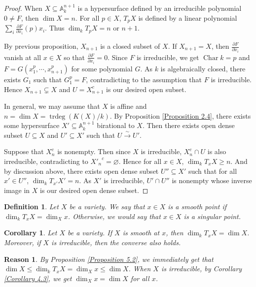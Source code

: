 \documentclass{ctexart}
\newtheorem{definition}{Definition}[section]
\newtheorem{reason}{Reason}[section]
\newtheorem{corollary}{Corollary}[section]
\newcommand{\trdeg}{\operatorname{trdeg}}
\newcommand{\characteristic}{\operatorname{Char}}
\begin{document}
\begin{proof}
    When $X \subseteq \mathbb{A}_{k}^{n + 1}$ is a hypersurface defined by an irreducible polynomial $0 \neq F$, then $\dim X = n$.
    For all $p\in X$, $T_{p}X$ is defined by a linear polynomial $\sum_{i} \frac{\partial F}{\partial x_{i}}(p)x_{i}$.
    Thus $\dim_{k} T_{p}X = n$ or $n + 1$.
    \par
    By previous proposition, $X_{n + 1}$ is a closed subset of $X$.
    If $X_{n + 1} = X$, then $\frac{\partial F}{\partial x_{i}}$ vanish at all $x\in X$ so that $\frac{\partial F}{\partial x_{i}} = 0$.
    Since $F$ is irreducible, we get $\characteristic k = p$ and $F = G(x_{1}^{p}, \cdots, x_{n + 1}^{p})$ for some polynomial $G$.
    As $k$ is algebraically closed, there exists $G_{1}$ such that $G_{1}^{p} = F$, contradicting to the assumption that $F$ is irreducible.
    Hence $X_{n + 1} \subsetneq X$ and $U = X_{n + 1}^{c}$ is our desired open subset.
    \par
    In general, we may assume that $X$ is affine and $n = \dim X = \trdeg (K(X)/k)$.
    By Proposition \ref{Proposition 2.4}, there exists some hypersurface $X' \subseteq \mathbb{A}_{k}^{n + 1}$ birational to $X$.
    Then there exists open dense subset $U \subseteq X$ and $U' \subseteq X'$ such that $U \overset{\sim}{\rightarrow} U'$.
    \par
    Suppose that $X_{n}^{c}$ is nonempty.
    Then since $X$ is irreducible, $X_{n}^{c} \cap U$ is also irreducible, contradicting to ${X'_{n}}^{c} = \varnothing$.
    Hence for all $x\in X$, $\dim_{k} T_{x}X \ge n$.
    And by discussion above, there exists open dense subset $U'' \subseteq X'$ such that for all $x'\in U''$, $\dim_{k} T_{x'}X' = n$.
    As $X'$ is irreducible, $U' \cap U''$ is nonempty whose inverse image in $X$ is our desired open dense subset.
\end{proof}
\begin{definition}
    Let $X$ be a variety.
    We say that $x\in X$ is a smooth point if $\dim_{k} T_{x}X = \dim_{X} x$.
    Otherwise, we would say that $x\in X$ is a singular point. 
\end{definition}
\begin{corollary}
    Let $X$ be a variety.
    If $X$ is smooth at $x$, then $\dim_{k} T_{x}X = \dim X$.
    Moreover, if $X$ is irreducible, then the converse also holds.
    \label{Corollary 5.1}
\end{corollary}
\begin{reason}
    By Proposition \ref{Proposition 5.2}, we immediately get that $\dim X \le \dim_{k} T_{x}X = \dim_{X} x \le \dim X$.
    When $X$ is irreducible, by Corollary \ref{Corollary 4.3}, we get $\dim_{X} x = \dim X$ for all $x$.
\end{reason}
\end{document}
